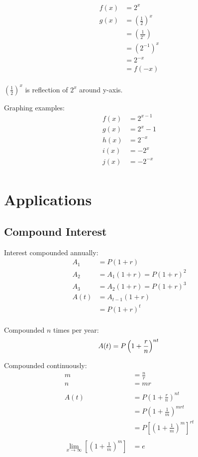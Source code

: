 \documentclass{exam}
\begin{document}
  \begin{align*}
    f(x) &= 2^x \\
    g(x) &= \left( \frac{1}{2} \right)^x \\
         &= \left( \frac{1}{2^x} \right) \\
         &= \left( 2^{-1} \right)^x \\
         &= 2^{-x} \\
         &= f(-x) \\
  \end{align*}

  $\left( \frac{1}{2} \right)^x$ is reflection of $2^x$ around y-axis.

  Graphing examples:
  \begin{align*}
    f(x) &= 2^{x - 1} \\
    g(x) &= 2^x - 1 \\
    h(x) &= 2^{-x} \\
    i(x) &= -2^x \\
    j(x) &= -2^{-x} \\
  \end{align*}

  \section{Applications}

  \subsection{Compound Interest}

  Interest compounded annually:
  \begin{align*}
    A_1  &= P(1 + r) \\
    A_2  &= A_1(1 + r) = P(1 + r)^2 \\
    A_3  &= A_2(1 + r) = P(1 + r)^3 \\
    A(t) &= A_{t - 1}(1 + r) \\
         &= P(1 + r)^t \\
  \end{align*}

  Compounded $n$ times per year: 
  \[
    A(t) = P \left( 1 + \frac{r}{n} \right)^{nt} \\
  \]

  Compounded continuously:
  \begin{align*}
    m &= \frac{n}{r} \\
    n &= mr \\
    \\
    A(t) &= P\left(1 + \frac{r}{n}\right)^{nt} \\
         &= P\left(1 + \frac{1}{m}\right)^{mrt} \\
         &= P \left[ \left(1 + \frac{1}{m}\right)^{m} \right]^{rt} \\
    \\
    \lim_{x \to \infty} \left[ \left(1 + \frac{1}{m}\right)^{m} \right] &= e \\
  \end{align*}
\end{document}
